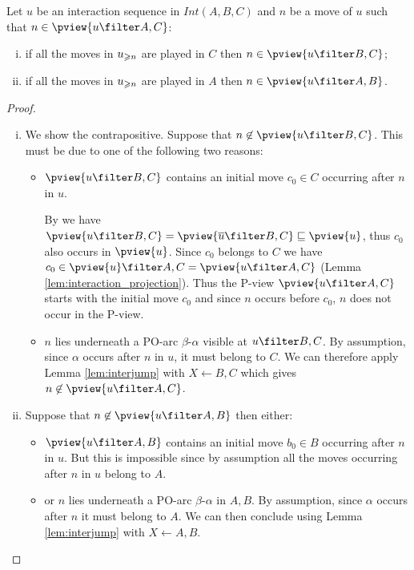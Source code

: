 \begin{lemma}
\label{lem:in_pviewAC_imp_in_pviewX}
Let $u$ be an interaction sequence in $Int(A,B,C)$ and
$n$ be a move of $u$ such that $n\in\pview{u \filter A,C}$:
\begin{enumerate}[i.]
\item 
if all the moves in $u_{\geqslant n}$ 
are played in $C$  then $n \in \pview{u \filter B,C}$;
\item 
if all the moves in $u_{\geqslant n}$ are played in $A$ then $n \in \pview{u \filter A,B}$.
\end{enumerate}
\end{lemma}
\begin{proof}
\begin{enumerate}[(i)]
\item
We show the contrapositive. Suppose that $n \not\in\pview{u \filter B,C}$. This must be due to one of the following  two
reasons:
\begin{itemize}[-]
\item $\pview{u \filter B,C}$ contains an initial move $c_0 \in C$
occurring after $n$ in $u$.


By \cite[Lemma 3.3.1]{Harmer2005}
we have $\pview{u \filter B,C} = \pview{\overline{u} \filter B,C} \subseqof \pview{u}$, thus $c_0$ also occurs in $\pview{u}$.
Since $c_0$ belongs to $C$ we have
$c_0 \in \pview{u} \filter A,C=
\pview{u \filter A,C}$ (Lemma \ref{lem:interaction_projection}).
Thus the P-view $\pview{u \filter A,C}$
starts with the initial move $c_0$ and
since $n$ occurs before $c_0$, $n$ does not occur in the P-view.

\item $n$ lies underneath a PO-arc $\beta$-$\alpha$ visible 
at $ u \filter B,C$.
By assumption, since $\alpha$ occurs after $n$ in $u$, it must belong to $C$. We can therefore apply Lemma \ref{lem:interjump}
with $X\leftarrow B,C$ which gives
$n \not\in\pview{u \filter A,C}$.
\end{itemize}

\item Suppose that $n \not\in\pview{u \filter A,B}$ then either:
\begin{itemize}[-]
\item $\pview{u \filter A,B}$ contains an initial move $b_0 \in B$
occurring after $n$ in $u$. But this is impossible since by assumption all the moves occurring after $n$ in $u$ belong to $A$.

\item or $n$ lies underneath a PO-arc $\beta$-$\alpha$ in $A,B$.
By assumption, since $\alpha$ occurs after $n$ it must belong to $A$. We can then conclude using 
Lemma \ref{lem:interjump} with $X\leftarrow A,B$.
\end{itemize}
\end{enumerate}
\end{proof}

